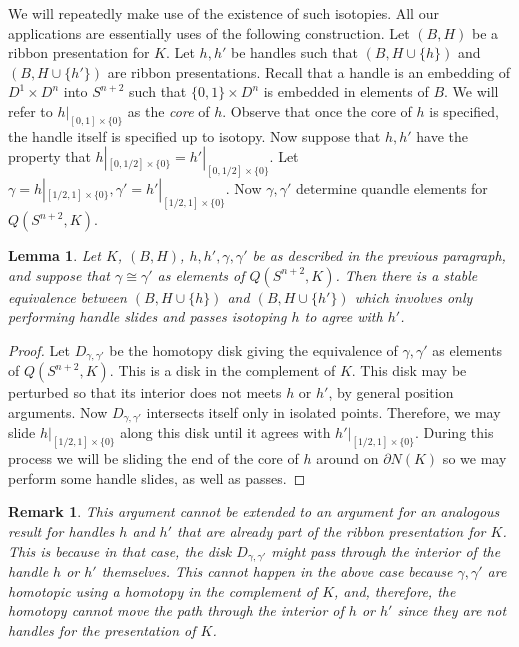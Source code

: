 \documentclass{amsart}
\newtheorem{lemma}[theorem]{Lemma}
\newtheorem{remark}[theorem]{Remark}
\newcommand{\bpr}{\begin{proof}}
\newcommand{\epr}{\end{proof}}
\begin{document}
We will repeatedly make use of the existence of such isotopies. All our applications are essentially uses of the following construction. Let $(B, H)$ be a ribbon presentation for $K$. Let $h, h'$ be handles such that $(B, H\cup \{h\})$ and $(B, H\cup \{h'\})$ are ribbon presentations. Recall that a handle is an embedding of $D^{1}\times D^{n}$ into $S^{n+2}$ such that $\{0,1\}\times D^{n}$ is embedded in elements of $B$. We will refer to $h|_{[0,1]\times\{0\}}$ as the \emph{core} of $h$. Observe that once the core of $h$ is specified, the handle itself is specified up to isotopy. Now suppose that $h, h'$ have the property that $h|_{[0,1/2]\times\{0\}}=h'|_{[0,1/2]\times\{0\}}$. Let $\gamma=h|_{[1/2,1]\times\{0\}}, \gamma'=h'|_{[1/2,1]\times\{0\}}$. Now $\gamma, \gamma'$ determine quandle elements for $Q(S^{n+2}, K)$.

\begin{lemma}
Let $K$, $(B, H)$, $h, h', \gamma, \gamma'$ be as described in the previous paragraph, and suppose that $\gamma\cong\gamma'$ as elements of $Q(S^{n+2}, K)$. Then there is a stable equivalence between $(B, H\cup \{h\})$ and $(B, H\cup \{h'\})$ which involves only performing handle slides and passes isotoping $h$ to agree with $h'$.\label{qhs}
\end{lemma}
\bpr Let $D_{\gamma, \gamma'}$ be the homotopy disk giving the equivalence of $\gamma, \gamma'$ as elements of $Q(S^{n+2}, K)$. This is a disk in the complement of $K$. This disk may be perturbed so that its interior does not meets $h$ or $h'$, by general position arguments. Now $D_{\gamma, \gamma'}$ intersects itself only in isolated points. Therefore, we may slide $h|_{[1/2, 1]\times\{0\}}$ along this disk until it agrees with $h'|_{[1/2, 1]\times\{0\}}$. During this process we will be sliding the end of the core of $h$ around on $\partial N(K)$ so we may perform some handle slides, as well as passes. \epr

\begin{remark}
This argument cannot be extended to an argument for an analogous result for handles $h$ and $h'$ that are already part of the ribbon presentation for $K$. This is because in that case, the disk $D_{\gamma, \gamma'}$ might pass through the interior of the handle $h$ or $h'$ themselves. This cannot happen in the above case because $\gamma, \gamma'$ are homotopic using a homotopy in the complement of $K$, and, therefore, the homotopy cannot move the path through the interior of $h$ or $h'$ since they are not handles for the presentation of $K$.
\end{remark}
\end{document}
